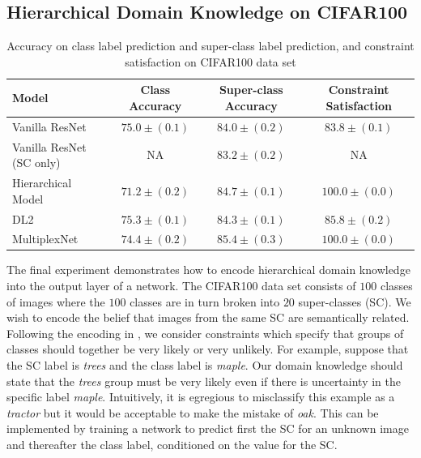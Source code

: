 \documentclass[letterpaper]{article} %
\begin{document}
\subsection{Hierarchical Domain Knowledge on CIFAR100}

\begin{table}
  \centering
  \begin{tabular}{l|ccc}
    \toprule
    Model     & Class Accuracy     & Super-class Accuracy & Constraint Satisfaction\\
    \midrule
    Vanilla ResNet          & $75.0 \pm (0.1)$ & $84.0 \pm (0.2)$ & $83.8 \pm (0.1)$ \\
    Vanilla ResNet (SC only)& NA               & $83.2 \pm (0.2)$ & NA \\
    Hierarchical Model      & $71.2 \pm (0.2)$ & $84.7 \pm (0.1)$ & $\mathbf{100.0 \pm (0.0)}$ \\
    DL2                     & $\mathbf{75.3 \pm (0.1)}$ & $84.3 \pm (0.1)$ & $85.8  \pm (0.2)$\\
    MultiplexNet            & $74.4 \pm (0.2)$ & $\mathbf{85.4 \pm (0.3)}$ & $\mathbf{100.0 \pm (0.0)}$         \\
    \bottomrule
  \end{tabular}
  \caption{Accuracy on class label prediction and super-class label prediction, and constraint satisfaction on CIFAR100 data set}
  \label{table:cifar100}
\end{table}

The final experiment demonstrates how to encode hierarchical domain knowledge into the output layer of a network.
The CIFAR100 \citep{krizhevsky2009learning} data set consists of $100$ classes of images where the $100$ classes are in turn broken into $20$ super-classes (SC).
We wish to encode the belief that images from the same SC are semantically related.
Following the encoding in \citet{fischer2018dl2}, we consider constraints which specify that groups of classes should together be very likely or very unlikely.
For example, suppose that the SC label is \textit{trees} and the class label is \textit{maple}.
Our domain knowledge should state that the \textit{trees} group must be very likely even if there is uncertainty in the specific label \textit{maple}.
Intuitively, it is egregious to misclassify this example as a \textit{tractor} but it would be acceptable to make the mistake of \textit{oak}.
This can be implemented by training a network to predict first the SC for an unknown image and thereafter the class label, conditioned on the value for the SC.
\end{document}
